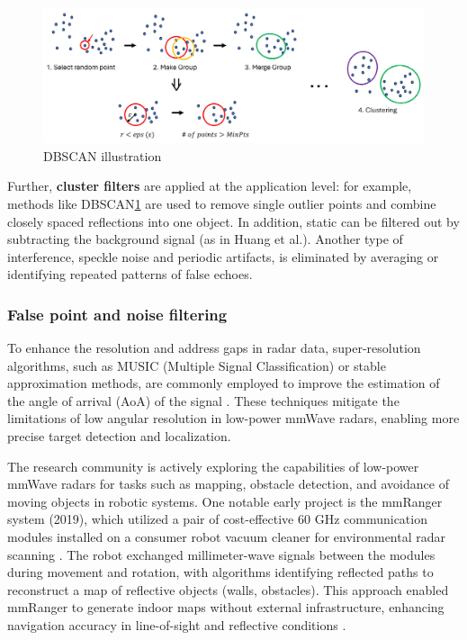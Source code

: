 \begin{figure}[h]
    \centering
    \includegraphics[width=\linewidth]{Src//images/electronics-13-03395-g001.png}
    \caption{DBSCAN illustration}
    \label{fig:DBSCAN}
\end{figure}

Further, \textbf{cluster filters} are applied at the application level: for example, methods like DBSCAN\ref{fig:DBSCAN}\citep{10.5555/3001460.3001507} are used to remove single outlier points and combine closely spaced reflections into one object. In addition, static can be filtered out by subtracting the background signal (as in Huang et al.). Another type of interference, speckle noise and periodic artifacts, is eliminated by averaging or identifying repeated patterns of false echoes.

\subsubsection{False point and noise filtering}
To enhance the resolution and address gaps in radar data, super-resolution algorithms, such as MUSIC (Multiple Signal Classification) or stable approximation methods, are commonly employed to improve the estimation of the angle of arrival (AoA) of the signal \citep{Schmidt1986, Richards2010}. These techniques mitigate the limitations of low angular resolution in low-power mmWave radars, enabling more precise target detection and localization.

The research community is actively exploring the capabilities of low-power mmWave radars for tasks such as mapping, obstacle detection, and avoidance of moving objects in robotic systems. One notable early project is the mmRanger system (2019), which utilized a pair of cost-effective 60 GHz communication modules installed on a consumer robot vacuum cleaner for environmental radar scanning \citep{Kumar2019mmRanger}. The robot exchanged millimeter-wave signals between the modules during movement and rotation, with algorithms identifying reflected paths to reconstruct a map of reflective objects (walls, obstacles). This approach enabled mmRanger to generate indoor maps without external infrastructure, enhancing navigation accuracy in line-of-sight and reflective conditions \citep{Kumar2019mmRanger}.


